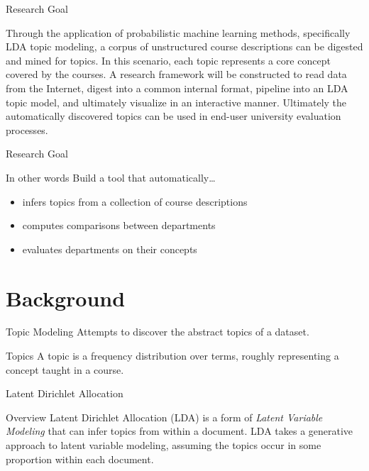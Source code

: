 \documentclass[10pt, compress]{beamer}
\begin{document}
\begin{frame}{Research Goal}

  \vfill
  Through the application of probabilistic machine learning methods,
  specifically LDA topic modeling, a corpus of unstructured course
  descriptions can be digested and mined for topics. In this scenario,
  each topic represents a core concept covered by the courses.
  \vfill
  A research framework will be constructed to read data from the
  Internet, digest into a common internal format, pipeline into an LDA
  topic model, and ultimately visualize in an interactive manner.
  \vfill
  Ultimately the automatically discovered topics can be used in end-user
  university evaluation processes.
  \vfill
\end{frame}


\begin{frame}{Research Goal}

  \begin{block}{In other words}
    Build a tool that automatically\ldots
    \onslide<+->
    \begin{itemize}[<+- | alert@+>]
      \item infers topics from a collection of course descriptions
      \item computes comparisons between departments
      \item evaluates departments on their concepts
    \end{itemize}
  \end{block}

\end{frame}


\section{Background}


\begin{frame}{Topic Modeling}
  Attempts to discover the abstract \alert{topics} of a dataset.

  \begin{block}{Topics}
    A \alert{topic} is a frequency distribution over terms, roughly
    representing a concept taught in a course.
  \end{block}
\end{frame}


\begin{frame}{Latent Dirichlet Allocation}
  \begin{block}{Overview}
    \alert{Latent Dirichlet Allocation (LDA)} is a form of \emph{Latent
    Variable Modeling} that can infer topics from within a document.
    \vfill
    LDA takes a generative approach to latent variable modeling, assuming
    the topics occur in some proportion within each document.
  \end{block}
\end{frame}
\end{document}
